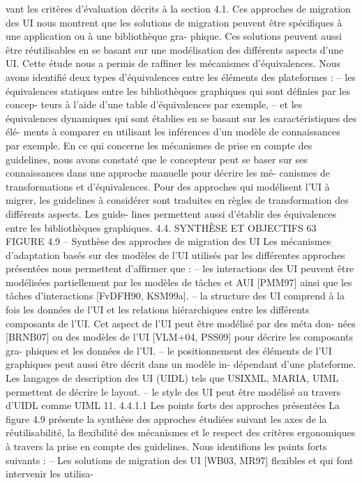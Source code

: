 \documentclass{article}
\begin{document}
vant les critères d’évaluation décrits à la section 4.1. Ces approches de migration des UI nous montrent
que les solutions de migration peuvent être spéciﬁques à une application ou à une bibliothèque gra-
phique. Ces solutions peuvent aussi être réutilisables en se basant sur une modélisation des différents
aspects d’une UI.
Cette étude nous a permis de rafﬁner les mécanismes d’équivalences. Nous avons identiﬁé deux
types d’équivalences entre les éléments des plateformes :
– les équivalences statiques entre les bibliothèques graphiques qui sont déﬁnies par les concep-
teurs à l’aide d’une table d’équivalences par exemple,
– et les équivalences dynamiques qui sont établies en se basant sur les caractéristiques des élé-
ments à comparer en utilisant les inférences d’un modèle de connaissances par exemple.
En ce qui concerne les mécanismes de prise en compte des guidelines, nous avons constaté que
le concepteur peut se baser sur ses connaissances dans une approche manuelle pour décrire les mé-
canismes de transformations et d’équivalences. Pour des approches qui modélisent l’UI à migrer, les
guidelines à considérer sont traduites en règles de transformation des différents aspects. Les guide-
lines permettent aussi d’établir des équivalences entre les bibliothèques graphiques.
4.4. SYNTHÈSE ET OBJECTIFS
63
FIGURE 4.9 – Synthèse des approches de migration des UI
Les mécanismes d’adaptation basés sur des modèles de l’UI utilisés par les différentes approches
présentées nous permettent d’afﬁrmer que :
– les interactions des UI peuvent être modélisées partiellement par les modèles de tâches et
AUI [PMM97] ainsi que les tâches d’interactions [FvDFH90, KSM99a].
– la structure des UI comprend à la fois les données de l’UI et les relations hiérarchiques entre
les différents composants de l’UI. Cet aspect de l’UI peut être modélisé par des méta don-
nées [BRNB07] ou des modèles de l’UI [VLM+04, PSS09] pour décrire les composants gra-
phiques et les données de l’UI.
– le positionnement des éléments de l’UI graphiques peut aussi être décrit dans un modèle in-
dépendant d’une plateforme. Les langages de description des UI (UIDL) tels que USIXML,
MARIA, UIML permettent de décrire le layout.
– le style des UI peut être modélisé au travers d’UIDL comme UIML 11.
4.4.1.1
Les points forts des approches présentées
La ﬁgure 4.9 présente la synthèse des approches étudiées suivant les axes de la réutilisabilité, la
ﬂexibilité des mécanismes et le respect des critères ergonomiques à travers la prise en compte des
guidelines. Nous identiﬁons les points forts suivants :
– Les solutions de migration des UI [WB03, MR97] ﬂexibles et qui font intervenir les utilisa-
\end{document}
